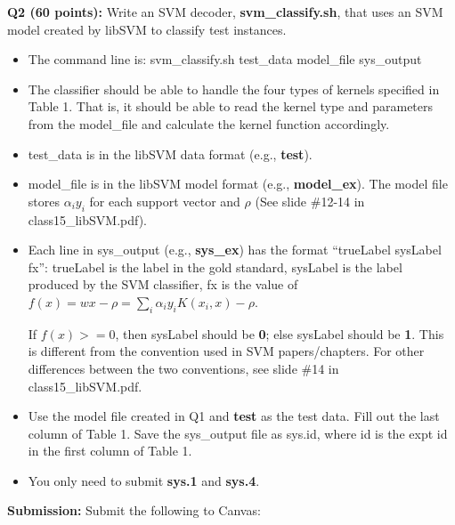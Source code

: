 \documentclass[11pt]{article}
\begin{document}
\vspace{0.5 in}
\hspace{-0.3in}
{\bf Q2 (60 points):} Write an SVM decoder, {\bf svm\_classify.sh}, that uses
   an SVM model created by libSVM to classify test instances.

\begin{itemize}
  \item The command line is: svm\_classify.sh test\_data model\_file sys\_output

  \item The classifier should be able to handle the four types of kernels specified in Table 1. That is, it should be able to read the kernel type and parameters from the model\_file and calculate the kernel function accordingly.

  \item test\_data is in the libSVM data format (e.g., {\bf test}).

  \item model\_file is in the libSVM model format (e.g., {\bf model\_ex}).
        The model file stores 
        $\alpha_i y_i$ for each support vector and $\rho$
        (See slide \#12-14 in class15\_libSVM.pdf).

  \item Each line in sys\_output (e.g., {\bf sys\_ex}) 
        has the format ``trueLabel sysLabel fx'': 
        trueLabel is the label in the gold standard, sysLabel is the label 
        produced by the SVM classifier, fx is the value of 
        $f(x)=wx-\rho=\sum_i \alpha_i y_i K(x_i, x)-\rho$.
        
        If $f(x)>=0$, then sysLabel should be {\bf 0}; 
           else sysLabel should be {\bf 1}.
        This is different from the convention used in SVM papers/chapters.
        For other differences between the two conventions, see
        slide \#14 in class15\_libSVM.pdf.

  \item Use the model file created in Q1 and {\bf test} as the test data.
        Fill out the last column of Table 1. Save the sys\_output file as
        sys.id, where id is the expt id in the first column of Table 1.

  \item You only need to submit {\bf sys.1} and {\bf sys.4}.

\end{itemize}


\vspace{0.5 in}
\hspace{-0.3in}
{\bf Submission:}  Submit the following to Canvas:
\end{document}
